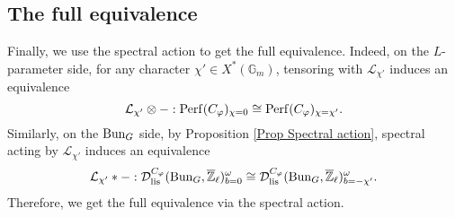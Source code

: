 








\subsection{The full equivalence}	

Finally, we use the spectral action to get the full equivalence. Indeed, on the $L$-parameter side, for any character $\chi' \in X^*(\mathbb{G}_m)$, tensoring with $\mathcal{\mathcal{L}_{\chi'}}$ induces an equivalence
$$\mathcal{\mathcal{L}_{\chi'}} \otimes -: \operatorname{\operatorname{Perf}}(C_{\varphi})_{\chi=0} \cong \operatorname{\operatorname{Perf}}(C_{\varphi})_{\chi=\chi'}.$$
Similarly, on the $\operatorname{\operatorname{Bun}}_G$ side, by Proposition \ref{Prop Spectral action}, spectral acting by $\mathcal{\mathcal{L}_{\chi'}}$ induces an equivalence
$$\mathcal{\mathcal{L}_{\chi'}}*-: \mathcal{D}_{\operatorname{\operatorname{lis}}}^{C_{\varphi}}(\operatorname{\operatorname{Bun}}_G, \overline{\mathbb{Z}}_{\ell})^{\omega}_{b=0} \cong \mathcal{D}_{\operatorname{\operatorname{lis}}}^{C_{\varphi}}(\operatorname{\operatorname{Bun}}_G, \overline{\mathbb{Z}}_{\ell})^{\omega}_{b=-\chi'}.$$ Therefore, we get the full equivalence via the spectral action.





